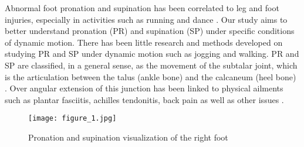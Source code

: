Abnormal foot pronation and supination has been correlated to leg and foot injuries, especially in activities such as running and dance \parencite{willems}.
Our study aims to better understand pronation (PR) and supination (SP) under specific conditions of dynamic motion.
There has been little research and methods developed on studying PR and SP under dynamic motion such as jogging and walking.
PR and SP are classified, in a general sense, as the movement of the subtalar joint, which is the articulation between the talus (ankle bone) and the calcaneum (heel bone) \parencite{griffiths}.
Over angular extension of this junction has been linked to physical ailments such as plantar fasciitis, achilles tendonitis, back pain as well as other issues \parencite{willems}.\par

\begin{figure}[h]
  \centering
  \texttt{[image: figure\_1.jpg]}
  \caption[Pronation visualization]{Pronation and supination visualization of the right foot \parencite{difference}}
  \label{fig:x pron. visual}
\end{figure}
